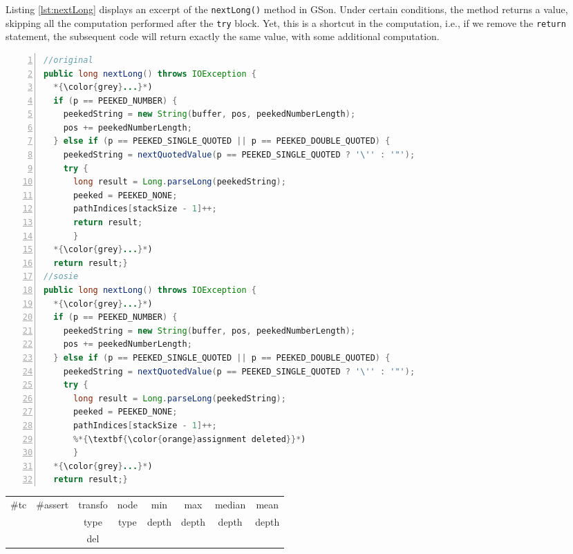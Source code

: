 Listing \ref{lst:nextLong} displays an excerpt of the \texttt{nextLong()} method in GSon. 
Under certain conditions, the method returns a value, skipping all the computation performed after the \texttt{try} block. 
Yet, this is a shortcut in the computation, i.e., if we remove the \texttt{return} statement, the subsequent code will return exactly the same value, with some additional computation. 

\begin{minipage}{\columnwidth}
\begin{lstlisting}[caption={\texttt{nextLong} in GSon and a sosie},label={lst:nextLong},language=java,numbers=left]
//original
public long nextLong() throws IOException {
  *{\color{grey}...}*)
  if (p == PEEKED_NUMBER) {
    peekedString = new String(buffer, pos, peekedNumberLength);
    pos += peekedNumberLength;
  } else if (p == PEEKED_SINGLE_QUOTED || p == PEEKED_DOUBLE_QUOTED) {
    peekedString = nextQuotedValue(p == PEEKED_SINGLE_QUOTED ? '\'' : '"');
    try {
      long result = Long.parseLong(peekedString);
      peeked = PEEKED_NONE;
      pathIndices[stackSize - 1]++;
      return result; 
      } 
  *{\color{grey}...}*)
  return result;}
//sosie
public long nextLong() throws IOException {
  *{\color{grey}...}*)
  if (p == PEEKED_NUMBER) {
    peekedString = new String(buffer, pos, peekedNumberLength);
    pos += peekedNumberLength;
  } else if (p == PEEKED_SINGLE_QUOTED || p == PEEKED_DOUBLE_QUOTED) {
    peekedString = nextQuotedValue(p == PEEKED_SINGLE_QUOTED ? '\'' : '"');
    try {
      long result = Long.parseLong(peekedString);
      peeked = PEEKED_NONE;
      pathIndices[stackSize - 1]++;
      %*{\textbf{\color{orange}assignment deleted}}*)
      } 
  *{\color{grey}...}*)
  return result;}
\end{lstlisting}
\tabcolsep=0.11cm
\begin{tabular}{>{\small}c>{\small}c>{\small}c>{\small}c>{\small}c>{\small}c>{\small}c>{\small}c}
\hline
\rowcolor{lightgray} \#tc & \#assert & transfo & node & min & max & median & mean   \\
\rowcolor{lightgray}  & & type & type & depth  & depth & depth & depth  \\ 
\hline
&  & del &  &  &  &  & \\
\hline
\end{tabular}
\end{minipage}
